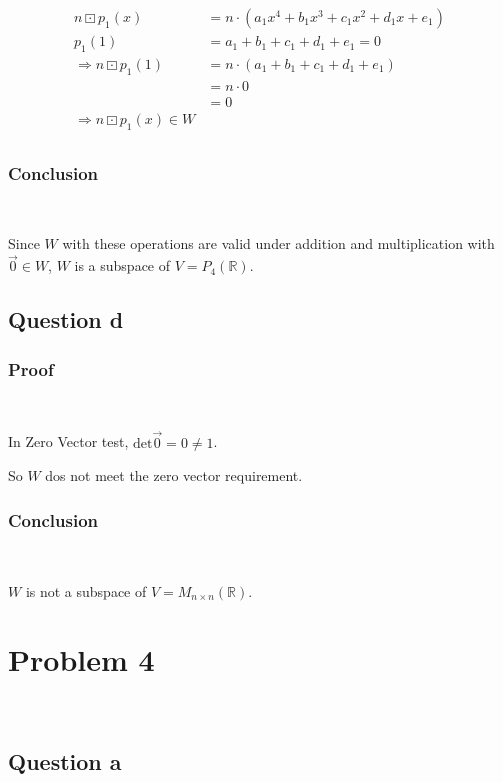 \documentclass{article}
\def\R{\mathbb{R}}
\begin{document}
\begin{equation}
\tag{3.3.3-1}
\begin{split}
n \boxdot p_1(x) &= n \cdot (a_1x^4+b_1x^3+c_1x^2+d_1x+e_1)\\
p_1(1) &= a_1 +b_1+c_1+d_1+e_1 = 0\\
\Rightarrow n \boxdot p_1(1)&=n\cdot (a_1 +b_1+c_1+d_1+e_1)\\
&= n\cdot 0\\
&= 0\\
\Rightarrow n \boxdot p_1(x) \in W\\
\end{split}
\end{equation}

\subsubsection{Conclusion}

~

Since $W$ with these operations are valid under addition and multiplication with $\overrightarrow{0} \in W$, $W$ is a subspace of $V = P_4(\R)$.

\subsection{Question d}

\subsubsection{Proof}

~

In Zero Vector test, $\mathrm{det} \overrightarrow{0} = 0 \ne 1$.

So $W$ dos not meet the zero vector requirement. 

\subsubsection{Conclusion}

~

$W$ is not a subspace of $V=M_{n\times n}(\R)$. 

\section{Problem 4}

~

\subsection{Question a}
\end{document}
